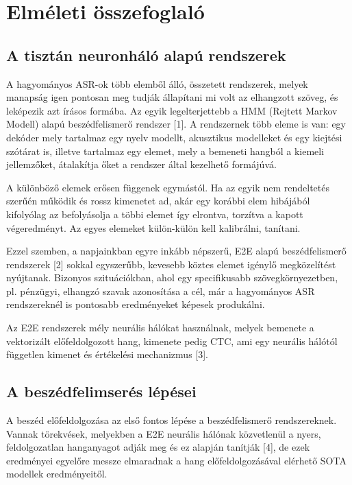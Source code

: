 \chapter{Elméleti összefoglaló}

\section{A tisztán neuronháló alapú rendszerek}

A hagyományos ASR-ok több elemből álló, összetett rendszerek, melyek manapság igen pontosan meg tudják állapítani mi volt az elhangzott szöveg, és leképezik azt írásos formába. Az egyik legelterjettebb a HMM (Rejtett Markov Modell) alapú beszédfelismerő rendszer [1]. A rendszernek több eleme is van: egy dekóder mely tartalmaz egy nyelv modellt, akusztikus modelleket és egy kiejtési szótárat is, illetve tartalmaz egy elemet, mely a bemeneti hangból a kiemeli jellemzőket, átalakítja őket a rendszer által kezelhető formájúvá.

A különböző elemek erősen függenek egymástól. Ha az egyik nem rendeltetés szerűén működik és rossz kimenetet ad, akár egy korábbi elem hibájából kifolyólag az befolyásolja a többi elemet így elrontva, torzítva a kapott végeredményt. Az egyes elemeket külön-külön kell kalibrálni, tanítani.

Ezzel szemben, a napjainkban egyre inkább népszerű, E2E alapú beszédfelismerő rendszerek [2] sokkal egyszerűbb, kevesebb köztes elemet igénylő megközelítést nyújtanak. Bizonyos szituációkban, ahol egy specifikusabb szövegkörnyezetben, pl. pénzügyi, elhangzó szavak azonosítása a cél, már a hagyományos ASR rendszereknél is pontosabb eredményeket képesek produkálni.

Az E2E rendszerek mély neurális hálókat használnak, melyek bemenete a vektorizált előfeldolgozott hang, kimenete pedig CTC, ami egy neurális hálótól független kimenet és értékelési mechanizmus [3].

\section{A beszédfelimserés lépései}

A beszéd előfeldolgozása az első fontos lépése a beszédfelismerő rendszereknek. Vannak törekvések, melyekben a E2E neurális hálónak közvetlenül a nyers, feldolgozatlan hanganyagot adják meg és ez alapján tanítják [4], de ezek eredményei egyelőre messze elmaradnak a hang előfeldolgozásával elérhető SOTA modellek eredményeitől.

